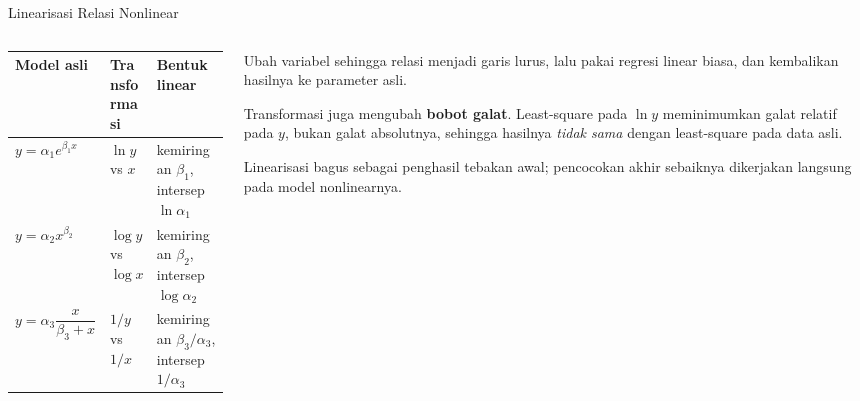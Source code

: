 \documentclass[aspectratio=169,10pt]{beamer}
\begin{document}
\begin{frame}{Linearisasi Relasi Nonlinear}
\scriptsize
\begin{columns}[T,totalwidth=\textwidth]
\begin{column}{.52\textwidth}
\renewcommand{\arraystretch}{1.45}
\begin{tabularx}{\linewidth}{X X X}
\toprule
Model asli & Transformasi & Bentuk linear\\
\midrule
$y=\alpha_1e^{\beta_1x}$ & $\ln y$ vs $x$ & kemiringan $\beta_1$, intersep $\ln\alpha_1$\\
$y=\alpha_2x^{\beta_2}$ & $\log y$ vs $\log x$ & kemiringan $\beta_2$, intersep $\log\alpha_2$\\
$y=\alpha_3\dfrac{x}{\beta_3+x}$ & $1/y$ vs $1/x$ & kemiringan $\beta_3/\alpha_3$, intersep $1/\alpha_3$\\
\bottomrule
\end{tabularx}
\end{column}
\begin{column}{.44\textwidth}
\begin{bluebox}[Gagasannya]
Ubah variabel sehingga relasi menjadi garis lurus, lalu pakai regresi linear biasa, dan kembalikan hasilnya ke parameter asli.
\end{bluebox}
\begin{orangebox}
Transformasi juga mengubah \textbf{bobot galat}. Least-square pada $\ln y$ meminimumkan galat relatif pada $y$, bukan galat absolutnya, sehingga hasilnya \emph{tidak sama} dengan least-square pada data asli.
\end{orangebox}
\begin{goldbox}
Linearisasi bagus sebagai penghasil tebakan awal; pencocokan akhir sebaiknya dikerjakan langsung pada model nonlinearnya.
\end{goldbox}
\end{column}
\end{columns}
\end{frame}
\end{document}
